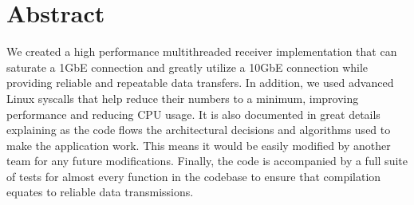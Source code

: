 \documentclass[tikz]{article}
\begin{document}

\newpage

\section{Abstract}

We created a high performance multithreaded receiver implementation that can saturate a 1GbE connection and greatly utilize a 10GbE connection while providing reliable and repeatable data transfers. In addition, we used advanced Linux syscalls that help reduce their numbers to a minimum, improving performance and reducing CPU usage. It is also documented in great details explaining as the code flows the architectural decisions and algorithms used to make the application work. This means it would be easily modified by another team for any future modifications. Finally, the code is accompanied by a full suite of tests for almost every function in the codebase to ensure that compilation equates to reliable data transmissions.

\newpage

\tableofcontents
\newpage


\newpage
\end{document}
